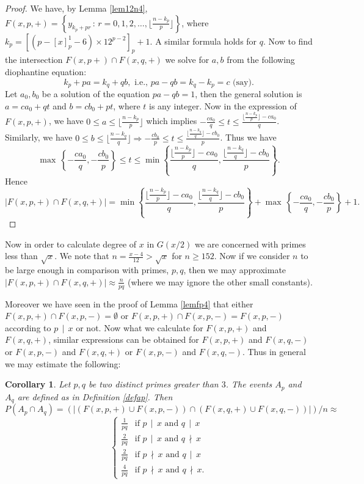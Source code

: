\documentclass[11pt]{article}
\newtheorem{corollary}[theorem]{Corollary}
\theoremstyle{definition}
\theoremstyle{remark}
\numberwithin{equation}{section}
\newcommand{\set}[1]{\left\{#1\right\}}
\newcommand{\Set}[2]{\set{#1\, :\, #2}}
\newcommand{\Div}[2]{#1\,\mid\, #2}
\newcommand{\nDiv}[2]{#1\,\nmid\, #2}
\begin{document}
\begin{proof}
We have, by Lemma \ref{lem12n4}, \\
$F(x,p,+)=\Set{y_{k_p+pr}}{r=0,1,2,\ldots,\lfloor \frac{n-k_p}{p}\rfloor}$, where $k_p=[(p-[x]_p^1-6)\times 12^{p-2}]_p+1$. A similar formula holds for $q$. Now to find the intersection $F(x,p+)\cap F(x,q,+)$ we solve for $a,b$ from the following diophantine equation: 
$$k_p+pa=k_q+qb,\text{ i.e., }pa-qb=k_q-k_p=c \text{ (say)}.$$
Let $a_0,b_0$ be a solution of the equation $pa-qb=1$, then the general solution is $a=ca_0+qt$ and $b=cb_0+pt$, where $t$ is any integer. Now in the expression of $F(x,p,+)$, we have $0\leq a\leq \lfloor \frac{n-k_p}{p}\rfloor$ which implies $-\frac{ca_0}{q}\leq t\leq \frac{\lfloor \frac{n-k_p}{p}\rfloor -ca_0}{q}$. Similarly, we have $0\leq b\leq \lfloor \frac{n-k_q}{q}\rfloor\Longrightarrow -\frac{cb_0}{p}\leq t\leq \frac{\lfloor \frac{n-k_q}{q}\rfloor -cb_0}{p}$. Thus we have 
$$\max\, \left\{-\frac{ca_0}{q},-\frac{cb_0}{p}\right\}\leq t\leq \min\left\{\frac{\lfloor \frac{n-k_p}{p}\rfloor -ca_0}{q}, \frac{\lfloor \frac{n-k_q}{q}\rfloor -cb_0}{p}\right\}.$$
Hence 
$$|F(x,p,+)\cap F(x,q,+)|= \min\left\{\frac{\lfloor \frac{n-k_p}{p}\rfloor -ca_0}{q}, \frac{\lfloor \frac{n-k_q}{q}\rfloor -cb_0}{p}\right\} + \max\, \left\{-\frac{ca_0}{q},-\frac{cb_0}{p}\right\} +1.$$
\end{proof}

\noindent
Now in order to calculate degree of $x$ in $G(x/2)$ we are concerned with primes less than $\sqrt{x}$. We note that $n=\frac{x-4}{12}>\sqrt{x}$ for $n\geq 152$. Now if we consider $n$ to be large enough in comparison with primes, $p,q$, then we may approximate $|F(x,p,+)\cap F(x,q,+)|\approx \frac{n}{pq}$ (where we may ignore the other small constants).

\vspace{1em}
\noindent
Moreover we have seen in the proof of Lemma \ref{lemfp4} that either $F(x,p,+)\cap F(x,p,-)=\emptyset$ or $F(x,p,+)\cap F(x,p,-)=F(x,p,-)$ according to $\Div{p}{x}$ or not. Now what we calculate for $F(x,p,+)$ and $F(x,q,+)$, similar expressions can be obtained for $F(x,p,+)$ and $F(x,q,-)$ or $F(x,p,-)$ and $F(x,q,+)$ or $F(x,p,-)$ and $F(x,q,-)$. Thus in general we may estimate the following:

\begin{corollary}
Let $p,q$ be two distinct primes greater than $3$. The events $A_p$ and $A_q$ are defined as in Definition \ref{defap}. Then
$$P(A_p\cap A_q)=(|(F(x,p,+)\cup F(x,p,-))\cap (F(x,q,+)\cup F(x,q,-))|)/n \approx$$
$$\left\{%
\begin{array}{ll}
\frac{1}{pq} & \text{if } \Div{p}{x}\text{ and }\Div{q}{x}\\
\frac{2}{pq} & \text{if } \Div{p}{x}\text{ and }\nDiv{q}{x}\\
\frac{2}{pq} & \text{if } \nDiv{p}{x}\text{ and }\Div{q}{x}\\
\frac{4}{pq} & \text{if } \nDiv{p}{x}\text{ and }\nDiv{q}{x}.
\end{array}\right.$$
\end{corollary}
\end{document}

